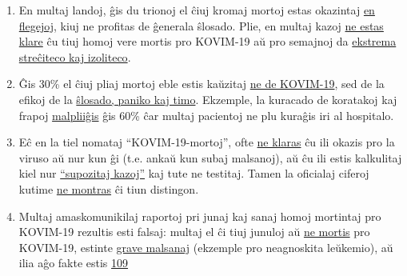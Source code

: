 \begin{enumerate}
{  morteco}.
\item
  En multaj landoj, ĝis du trionoj el ĉiuj kromaj mortoj estas okazintaj
  \href{https://swprs.org/studies-on-covid-19-lethality/\#care-homes}{en
  flegejoj}, kiuj ne profitas de ĝenerala ŝlosado. Plie, en multaj kazoj
  \href{https://www.hsj.co.uk/commissioning/thousands-of-extra-deaths-outside-hospital-not-attributed-to-covid-19/7027459.article}{ne
  estas klare} ĉu tiuj homoj vere mortis pro KOVIM-19 aŭ pro semajnoj da
  \href{https://www.theguardian.com/world/2020/jun/05/covid-19-causing-10000-dementia-deaths-beyond-infections-research-says}{ekstrema
  streĉiteco kaj izoliteco}.
\item
  Ĝis 30\% el ĉiuj pliaj mortoj eble estis kaŭzitaj
  \href{https://www.ons.gov.uk/peoplepopulationandcommunity/birthsdeathsandmarriages/deaths/articles/analysisofdeathregistrationsnotinvolvingcoronaviruscovid19englandandwales28december2019to1may2020/technicalannex}{ne
  de KOVIM-19}, sed de la efikoj de la
  \href{https://www.telegraph.co.uk/global-health/science-and-disease/two-new-waves-deaths-break-nhs-new-analysis-warns/}{ŝlosado,
  paniko kaj timo}. Ekzemple, la kuracado de koratakoj kaj frapoj
  \href{https://www.nytimes.com/2020/04/06/well/live/coronavirus-doctors-hospitals-emergency-care-heart-attack-stroke.html}{malpliiĝis}
  ĝis 60\% ĉar multaj pacientoj ne plu kuraĝis iri al hospitalo.
\item
  Eĉ en la tiel nomataj ``KOVIM-19-mortoj'', ofte
  \href{https://spectator.us/understand-report-figures-covid-deaths/}{ne
  klaras} ĉu ili okazis pro la viruso aŭ nur kun ĝi (t.e. ankaŭ kun
  subaj malsanoj), aŭ ĉu ili estis kalkulitaj kiel nur
  \href{https://www.youtube.com/watch?v=V0lIWZpiRU0}{``supozitaj
  kazoj''} kaj tute ne testitaj. Tamen la oficialaj ciferoj kutime
  \href{https://www.hsj.co.uk/coronavirus/systematic-reviews-to-discover-true-cause-of-outbreak-deaths/7027491.article}{ne
  montras} ĉi tiun distingon.
\item
  Multaj amaskomunikilaj raportoj pri junaj kaj sanaj homoj mortintaj
  pro KOVIM-19 rezultis esti falsaj: multaj el ĉi tiuj junuloj aŭ
  \href{https://www.dailymail.co.uk/news/article-8193487/Coroner-refuses-rule-COVID-19-cause-death-six-week-old-Connecticut-baby.html}{ne
  mortis} pro KOVIM-19, estinte
  \href{https://sports.yahoo.com/spanish-football-coach-francisco-garcia-163153573.html}{grave
  malsanaj} (ekzemple pro neagnoskita leŭkemio), aŭ ilia aĝo fakte estis
  \href{https://www.n-tv.de/panorama/Neunjaehrige-Corona-Tote-war-109-Jahre-alt-article21753784.html}{109
}
\end{enumerate}

